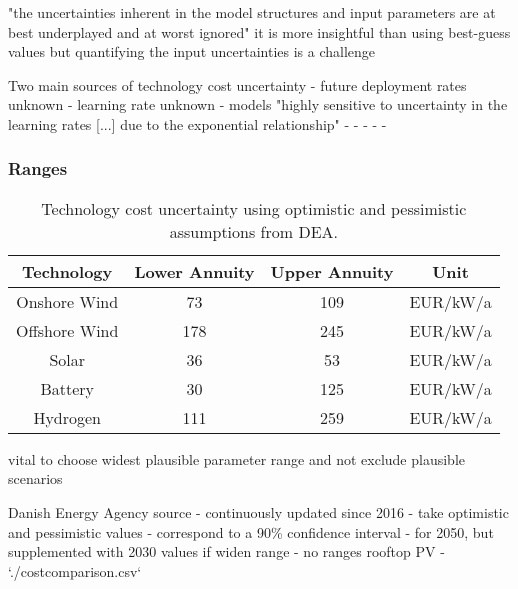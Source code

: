 "the uncertainties inherent in the model structures and input parameters are at best underplayed and at worst ignored" \cite{yue_review_2018}
it is more insightful than using best-guess values \cite{fraiture_robustness_2020}
but quantifying the input uncertainties is a challenge \cite{moret_characterization_2017}

Two main sources of technology cost uncertainty \cite{trondle_trade-offs_2020}
- future deployment rates unknown
- learning rate unknown
- models "highly sensitive to uncertainty in the learning rates [...] due to the exponential relationship" \cite{mattsson_learning_2019}
- \cite{yeh_review_2012}
- \cite{heuberger_power_2017}
- \cite{gritsevskyi_modeling_2000}
- \cite{schmidt_projecting_2019}
- \cite{schmidt_future_2017}

\subsubsection{Ranges}

\begin{SCtable}
    \begin{small}
        \begin{tabular}{cccc}
            \toprule
            Technology & Lower Annuity & Upper Annuity & Unit  \\ \midrule
            Onshore Wind & 73 & 109 & EUR/kW/a \\
            Offshore Wind & 178 & 245 & EUR/kW/a \\ %
            Solar & 36 & 53 & EUR/kW/a \\
            Battery & 30 & 125 & EUR/kW/a \\
            Hydrogen & 111 & 259 & EUR/kW/a \\ \bottomrule
        \end{tabular}
    \end{small}
    \caption{Technology cost uncertainty using optimistic and pessimistic assumptions from DEA.}
    \label{tab:costuncertainty}
\end{SCtable}   

vital to choose widest plausible parameter range and not exclude plausible scenarios \cite{moret_characterization_2017,mccollum_energy_2020}

Danish Energy Agency source
- continuously updated since 2016
- take optimistic and pessimistic values
- correspond to a 90\% confidence interval
- for 2050, but supplemented with 2030 values if widen range
- no ranges rooftop PV
- `./costcomparison.csv`

